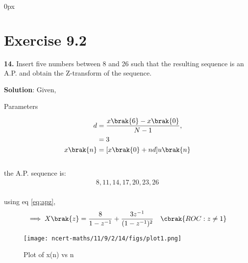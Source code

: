 \documentclass[journal,12pt,twocolumn]{IEEEtran}
\begin{document}
\parindent 0px


\vspace{3cm}

\title{}
\author{EE23BTECH11208 - Manohar K$^{*}$
}
\maketitle
\newpage
\bigskip


\section*{Exercise 9.2}

\noindent \textbf{14.} \hspace{2pt} Insert five numbers between 8 and 26 such that the resulting sequence is an A.P. and obtain the Z-transform of the sequence.

\noindent \textbf{Solution}:
\noindent
\fi
Given,
\begin{table}[ht]
    \centering
    
    \caption{Parameters}
    \label{tab: 11.9.2.14.1}
\end{table}
\begin{align}
	d&=\frac{x\brak{6} - x\brak{0}}{N-1},\\
    &=3\\
	x\brak{n}&=[x\brak{0}+nd] u\brak{n}
\end{align}\\	
the A.P. sequence is:\\
\begin{align}
8,11,14,17,20,23,26
\end{align}\\
using eq \eqref{eq:apz},
\begin{align}
    \implies X\brak{z}&=\frac{8}{1-z^{-1}} + \frac{3 z^{-1}}{(1-z^{-1})^2} &\cbrak{ROC : z \neq 1}
\end{align}
\begin{figure}[ht]
\centering
   \texttt{[image: ncert-maths/11/9/2/14/figs/plot1.png]}
   \caption{Plot of x(n) vs n}
   \hfill\label{fig: 11.9.2.14}
\end{figure}
\end{document}
